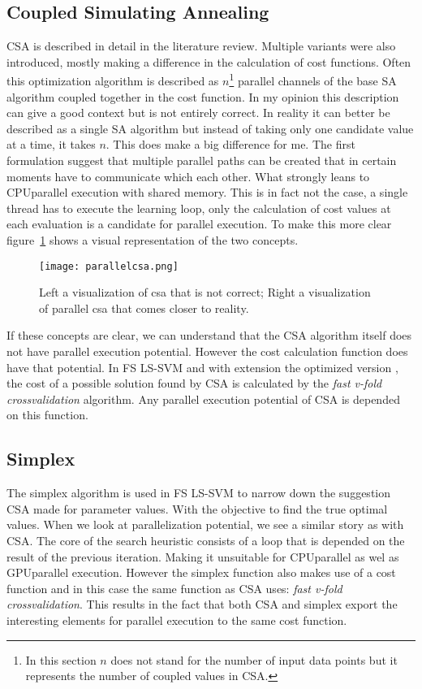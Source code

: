 \subsection{Coupled Simulating Annealing}
CSA is described in detail in the literature review. 
Multiple variants were also introduced, mostly making a difference in the calculation of cost functions.
Often this optimization algorithm is described as $n$\footnote{In this section $n$ does not stand for the number of input data points but it represents the number of coupled values in CSA.} parallel channels of the base SA algorithm coupled together in the cost function.
In my opinion this description can give a good context but is not entirely correct.
In reality it can better be described as a single SA algorithm but instead of taking only one candidate value at a time, it takes $n$.
This does make a big difference for me.
The first formulation suggest that multiple parallel paths can be created that in certain moments have to communicate which each other.
What strongly leans to CPUparallel execution with shared memory.
This is in fact not the case, a single thread has to execute the learning loop, only the calculation of cost values at each evaluation is a candidate for parallel execution.
To make this more clear figure~\ref{fig:parallelcsa} shows a visual representation of the two concepts.
\begin{figure}
	\centering
	\texttt{[image: parallelcsa.png]}
	\caption{Left a visualization of csa that is not correct; Right a visualization of parallel csa that comes closer to reality.}
	\label{fig:parallelcsa}
\end{figure}
\par 
If these concepts are clear, we can understand that the CSA algorithm itself does not have parallel execution potential.
However the cost calculation function does have that potential.
In FS LS-SVM and with extension the optimized version \cite{Optimized2010:article}, the cost of a possible solution found by CSA is calculated by the \textit{fast v-fold crossvalidation} algorithm.
Any parallel execution potential of CSA is depended on this function. 
\subsection{Simplex}
The simplex algorithm is used in FS LS-SVM to narrow down the suggestion CSA made for parameter values.
With the objective to find the true optimal values.
When we look at parallelization potential, we see a similar story as with CSA.
The core of the search heuristic consists of a loop that is depended on the result of the previous iteration.
Making it unsuitable for CPUparallel as wel as GPUparallel execution.
However the simplex function also makes use of a cost function and in this case the same function as CSA uses: \textit{fast v-fold crossvalidation}.
This results in the fact that both CSA and simplex export the interesting elements for parallel execution to the same cost function.
